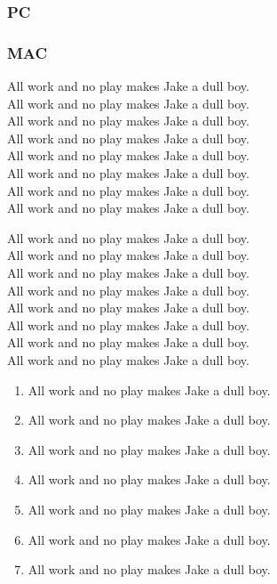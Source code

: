 \documentclass[12pt]{report}
\begin{document}
\subsubsection{PC}
\subsubsection{MAC}

All work and no play makes Jake a dull boy.\\
All work and no play makes Jake a dull boy.\\
All work and no play makes Jake a dull boy.\\
All work and no play makes Jake a dull boy.\\
All work and no play makes Jake a dull boy.\\
All work and no play makes Jake a dull boy.\\
All work and no play makes Jake a dull boy.\\
All work and no play makes Jake a dull boy.\\
\begin{flushright}
All work and no play makes Jake a dull boy.\\
All work and no play makes Jake a dull boy.\\
All work and no play makes Jake a dull boy.\\
All work and no play makes Jake a dull boy.\\
All work and no play makes Jake a dull boy.\\
All work and no play makes Jake a dull boy.\\
All work and no play makes Jake a dull boy.\\
All work and no play makes Jake a dull boy.\\
\end{flushright}
\begin{enumerate}
\item All work and no play makes Jake a dull boy.\\
\item All work and no play makes Jake a dull boy.\\
\item All work and no play makes Jake a dull boy.\\
\item All work and no play makes Jake a dull boy.\\
\item All work and no play makes Jake a dull boy.\\
\item All work and no play makes Jake a dull boy.\\
\item All work and no play makes Jake a dull boy.\\
\end{enumerate}
\end{document}
